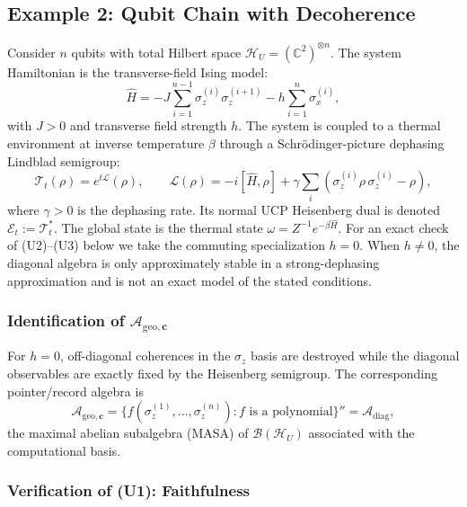 \documentclass[12pt,a4paper,openany]{book}
\begin{document}
\subsection{Example 2: Qubit Chain with Decoherence}
\label{H-D-sec:qubit}

Consider $n$ qubits with total Hilbert space $\mathcal{H}_U = (\mathbb{C}^2)^{\otimes n}$.
The system Hamiltonian is the transverse-field Ising model:
\begin{equation}
\hat{H} = -J \sum_{i=1}^{n-1} \sigma_z^{(i)} \sigma_z^{(i+1)} - h \sum_{i=1}^{n} \sigma_x^{(i)},
\end{equation}
with $J > 0$ and transverse field strength $h$.
The system is coupled to a thermal environment at inverse temperature $\beta$ through a Schr\"odinger-picture dephasing Lindblad semigroup:
\begin{equation}
\label{H-D-eq:lindblad}
\mathcal{T}_t(\rho) = e^{t\mathcal{L}}(\rho), \qquad \mathcal{L}(\rho) = -i[\hat{H}, \rho] + \gamma \sum_i \left(\sigma_z^{(i)} \rho\, \sigma_z^{(i)} - \rho\right),
\end{equation}
where $\gamma > 0$ is the dephasing rate.  Its normal UCP Heisenberg dual is denoted $\mathcal E_t:=\mathcal T_t^*$.
The global state is the thermal state $\omega = Z^{-1} e^{-\beta \hat{H}}$.  For an exact check of (U2)--(U3) below we take the commuting specialization $h=0$.  When $h\ne0$, the diagonal algebra is only approximately stable in a strong-dephasing approximation and is not an exact model of the stated conditions.

\subsubsection{Identification of $\mathcal{A}_{\mathrm{geo},\mathbf{c}}$}

For $h=0$, off-diagonal coherences in the $\sigma_z$ basis are destroyed while the diagonal observables are exactly fixed by the Heisenberg semigroup.  The corresponding pointer/record algebra is
\begin{equation}
\mathcal{A}_{\mathrm{geo},\mathbf{c}} = \{f(\sigma_z^{(1)}, \ldots, \sigma_z^{(n)}) : f \text{ is a polynomial}\}'' = \mathcal{A}_{\mathrm{diag}},
\end{equation}
the maximal abelian subalgebra (MASA) of $\mathcal{B}(\mathcal{H}_U)$ associated with the computational basis.

\subsubsection{Verification of (U1): Faithfulness}
\end{document}
